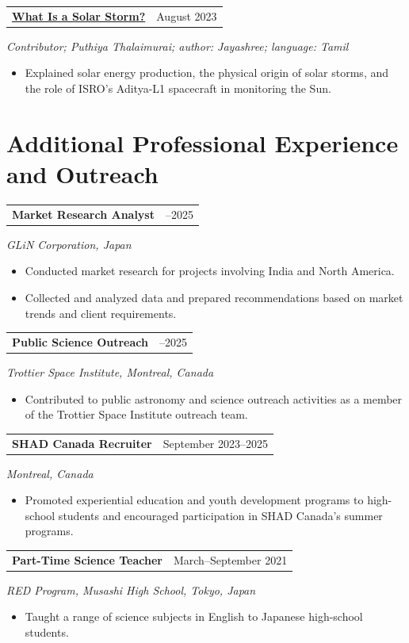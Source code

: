 \documentclass[10pt,a4paper]{article}
\makeatletter
\newcommand{\grantheading}[2]{%
\begin{tabularx}{\textwidth}{
    @{}
    >{\raggedright\arraybackslash}X
    >{\raggedleft\arraybackslash}p{4.5cm}
    @{}
}
\textbf{#1} & #2
\end{tabularx}
}
\newenvironment{lightitems}
{%
  \begin{itemize}[
      label=\textcolor{entrylight}{\textbullet},
      leftmargin=1.3em,
      itemsep=1pt,
      topsep=2pt,
      parsep=0pt
  ]
  \color{entrylight}
}
{%
  \end{itemize}
}
\makeatother
\begin{document}
\grantheading
{\href{https://www.puthiyathalaimurai.com/technology/what-causes-solar-storms-in-sun}
{What Is a Solar Storm?}}
{August 2023}
\emph{Contributor; Puthiya Thalaimurai; author: Jayashree; language: Tamil}

\begin{lightitems}
\item
\vspace{-1.5mm}Explained solar energy production, the physical origin of solar storms,
and the role of ISRO's Aditya-L1 spacecraft in monitoring the Sun.
\end{lightitems}


\section{Additional Professional Experience and Outreach}


\grantheading
{Market Research Analyst}
{2024--2025}
\emph{GLiN Corporation, Japan}
\begin{lightitems}
\item
\vspace{-1.5mm}Conducted market research for projects involving India and North
America.
\item
Collected and analyzed data and prepared recommendations based on
market trends and client requirements.
\end{lightitems}

\grantheading
{Public Science Outreach}
{2023--2025}
\emph{Trottier Space Institute, Montreal, Canada}
\begin{lightitems}
\item
\vspace{-1.5mm}Contributed to public astronomy and science outreach activities as a
member of the Trottier Space Institute outreach team.
\end{lightitems}

\grantheading
{SHAD Canada Recruiter}
{September 2023--2025}
\emph{Montreal, Canada}
\begin{lightitems}
\item
\vspace{-1.5mm}Promoted experiential education and youth development programs to
high-school students and encouraged participation in SHAD Canada's
summer programs.
\end{lightitems}

\grantheading
{Part-Time Science Teacher}
{March--September 2021}
\emph{RED Program, Musashi High School, Tokyo, Japan}
\begin{lightitems}
\item
\vspace{-1.5mm}Taught a range of science subjects in English to Japanese high-school
students.
\end{lightitems}
\end{document}
